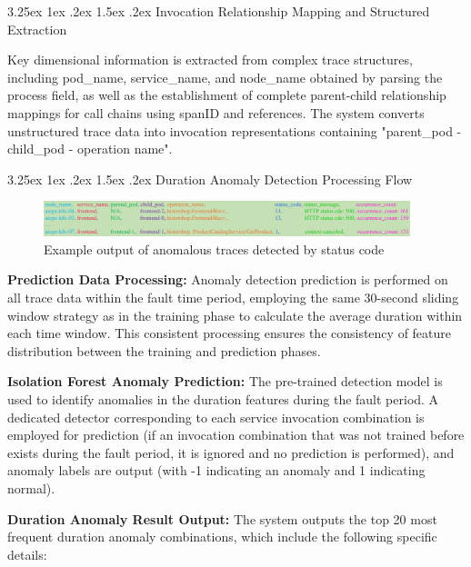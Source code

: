 \documentclass[10pt]{article}
\makeatletter
\renewcommand{\paragraph}{%
    \@startsection{paragraph}{4}{\z@}%
    {3.25ex \@plus1ex \@minus.2ex}%
    {1.5ex \@plus.2ex}%
    {\normalfont\normalsize\itshape}%
}
\makeatother
\begin{document}
\paragraph{Invocation Relationship Mapping and Structured Extraction}

Key dimensional information is extracted from complex trace structures, including pod\_name, service\_name, and node\_name obtained by parsing the process field, as well as the establishment of complete parent-child relationship mappings for call chains using spanID and references. The system converts unstructured trace data into invocation representations containing "parent\_pod - child\_pod - operation name".

\paragraph{Duration Anomaly Detection Processing Flow}

\begin{figure}[htbp]
    \centering
    \includegraphics[width=0.95\textwidth]{pics/fig11.pdf}
    \caption{Example output of anomalous traces detected by status code}
    \label{fig11}
\end{figure}

\textbf{Prediction Data Processing:} Anomaly detection prediction is performed on all trace data within the fault time period, employing the same 30-second sliding window strategy as in the training phase to calculate the average duration within each time window. This consistent processing ensures the consistency of feature distribution between the training and prediction phases.

\textbf{Isolation Forest Anomaly Prediction:} The pre-trained detection model is used to identify anomalies in the duration features during the fault period. A dedicated detector corresponding to each service invocation combination is employed for prediction (if an invocation combination that was not trained before exists during the fault period, it is ignored and no prediction is performed), and anomaly labels are output (with -1 indicating an anomaly and 1 indicating normal).

\textbf{Duration Anomaly Result Output:} The system outputs the top 20 most frequent duration anomaly combinations, which include the following specific details:
\end{document}
